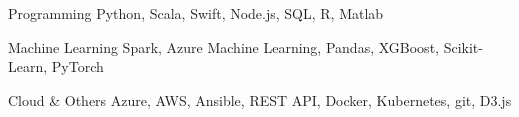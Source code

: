 \begin{cvskills}

  \cvskill
    {Programming}
    {Python, Scala, Swift, Node.js, SQL, R, Matlab}

  \cvskill
    {Machine Learning}
    {Spark, Azure Machine Learning, Pandas, XGBoost, Scikit-Learn, PyTorch}

  \cvskill
    {Cloud \& Others}
    {Azure, AWS, Ansible, REST API, Docker, Kubernetes, git, D3.js}

\end{cvskills}
